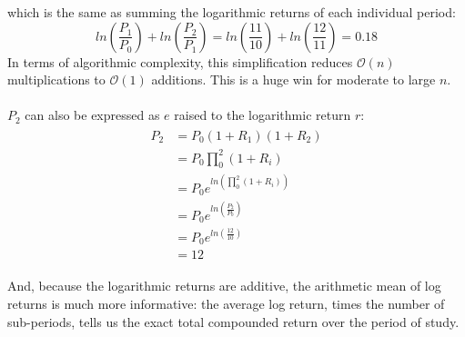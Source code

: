 \documentclass[11pt, oneside]{article}   	%
\begin{document}
which is the same as summing the logarithmic returns of each individual period:
\begin{equation}
ln(\frac{P_1}{P_0}) + ln(\frac{P_2}{P_1})  = ln(\frac{11}{10}) + ln(\frac{12}{11}) = 0.18
\end{equation}
In terms of algorithmic complexity, this simplification reduces $\mathcal{O}(n)$ multiplications to $\mathcal{O}(1)$ additions. This is a huge win for moderate to large $n$. 
\\
\\
$P_2$ can also be expressed as $e$ raised to the logarithmic return $r$:
\begin{align*}
	\begin{split}
		P_2 & = P_0 (1+R_1)(1+R_2) \\
		& = P_0  \displaystyle{\prod_{0}^{2}} (1 + R_i) \\ 
		& = P_0 e^{ln( \displaystyle{\prod_{0}^{2}} (1+R_i))} \\
		& = P_0 e^{ln(\frac{P_2}{P_0})} \\
		& = P_0 e^{ln(\frac{12}{10})} \\
		& = 12
	\end{split}
\end{align*}

And, because the logarithmic returns are additive, the arithmetic mean of log returns is much more informative: the average log return, times the number of sub-periods, tells us the exact total compounded return over the period of study.
\end{document}
